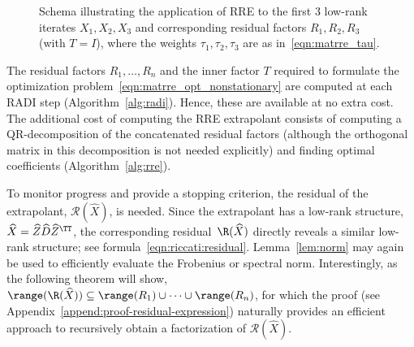 \begin{figure}[t]
	\centering
	\newcommand\ifresiduals\iftrue%
	\resizebox{\linewidth}{!}{}
	\caption{%
		Schema illustrating the application of \ac{RRE} to the first 3 low-rank
		iterates $X_1, X_2, X_3$ and corresponding residual factors $R_1, R_2, R_3$ (with $T = I$),
		where the weights $\tau_1, \tau_2, \tau_3$ are as in~\eqref{eqn:matrre_tau}.
	}%
	\label{fig:matrre_radi}
\end{figure}

\begin{remark}
	The residual factors $R_1,\ldots,R_n$ and the inner factor $T$ required to formulate the optimization problem~\eqref{eqn:matrre_opt_nonstationary} are computed at each RADI step (Algorithm~\ref{alg:radi}).
Hence, these are available at no extra cost.
The additional cost of computing the \ac{RRE} extrapolant consists of computing a QR-decomposition of the concatenated residual factors (although the orthogonal matrix in this decomposition is not needed explicitly) and finding optimal coefficients (Algorithm~\ref{alg:rre}).
\end{remark}

To monitor progress and provide a stopping criterion, the residual of the
extrapolant, \(\mathscr{R}(\widehat{X})\), is needed.
Since the extrapolant has a low-rank structure,
$\widehat{X} = \widehat{Z} \widehat{D} \widehat{Z}^\TT$,
the corresponding residual~$\R(\widehat{X})$ directly reveals a similar low-rank structure;
see formula~\eqref{eqn:riccati:residual}.
Lemma~\ref{lem:norm} may again be used to efficiently evaluate the Frobenius or spectral norm.
Interestingly, as the following theorem will show,
$\range(\R(\widehat{X})) \subseteq \range(R_1) \cup\dots\cup \range(R_n)$,
for which the proof (see Appendix~\ref{append:proof-residual-expression}) naturally provides an efficient approach to recursively obtain a factorization of $\mathscr{R}(\widehat{X})$.

